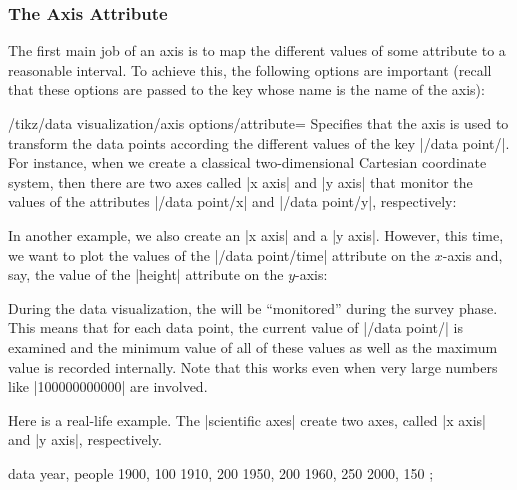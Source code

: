 \subsubsection{The Axis Attribute}

The first main job of an axis is to map the different values of some
attribute to a reasonable interval. To achieve this, the following
options are important (recall that these options are passed to the key
whose name is the name of the axis):

\begin{key}{/tikz/data visualization/axis options/attribute=}
  Specifies that the axis is used to transform the data points
  according the different values of the key
  |/data point/|. For instance, when we create a
  classical two-dimensional Cartesian coordinate system, then there
  are two axes called |x axis| and |y axis| that monitor the values of
  the attributes |/data point/x| and |/data point/y|, respectively:
\begin{codeexample}
\end{codeexample}
  In another example, we also create an |x axis| and a
  |y axis|. However, this time, we want to plot the values of the
  |/data point/time| attribute on the $x$-axis and, say, the value of
  the |height| attribute on the $y$-axis:
\begin{codeexample}
\end{codeexample}
  During the data visualization, the  will be
  ``monitored'' during the survey phase. This means that for each data
  point, the current value of |/data point/| is
  examined and the minimum value of all of these values as well as the
  maximum value is recorded internally. Note that this works even when
  very large numbers like |100000000000| are involved.

  Here is a real-life example. The |scientific axes| create two axes,
  called |x axis| and |y axis|, respectively.
\begin{codeexample}[]
\tikz \datavisualization [scientific axes,
                          x axis={attribute=people, length=2.5cm, ticks=few},
                          y axis={attribute=year},
                          visualize as scatter]
  data {
    year, people
    1900, 100
    1910, 200
    1950, 200
    1960, 250
    2000, 150
  };
\end{codeexample}
\end{key}


